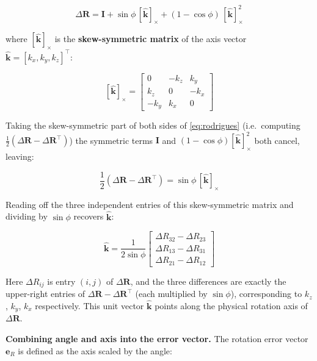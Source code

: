 \begin{equation}
\label{eq:rodrigues}
\Delta\mathbf{R}
= \mathbf{I} + \sin\phi\,[\hat{\mathbf{k}}]_\times
+ (1-\cos\phi)\,[\hat{\mathbf{k}}]_\times^2
\end{equation}

where $[\hat{\mathbf{k}}]_\times$ is the \textbf{skew-symmetric matrix}
of the axis vector $\hat{\mathbf{k}}=[k_x,k_y,k_z]^\top$:

\begin{equation}
\label{eq:skew}
[\hat{\mathbf{k}}]_\times =
\begin{bmatrix}
 0   & -k_z &  k_y \\
 k_z &  0   & -k_x \\
-k_y &  k_x &  0
\end{bmatrix}
\end{equation}

Taking the skew-symmetric part of both sides of \cref{eq:rodrigues}
(i.e.\ computing $\tfrac{1}{2}(\Delta\mathbf{R}-\Delta\mathbf{R}^\top)$)
the symmetric terms $\mathbf{I}$ and $(1-\cos\phi)[\hat{\mathbf{k}}]_\times^2$
both cancel, leaving:

\begin{equation}
\frac{1}{2}(\Delta\mathbf{R}-\Delta\mathbf{R}^\top)
= \sin\phi\,[\hat{\mathbf{k}}]_\times
\end{equation}

Reading off the three independent entries of this skew-symmetric matrix
and dividing by $\sin\phi$ recovers $\hat{\mathbf{k}}$:

\begin{equation}
\label{eq:axis}
\hat{\mathbf{k}} = \frac{1}{2\sin\phi}
\begin{bmatrix}
\Delta R_{32}-\Delta R_{23} \\
\Delta R_{13}-\Delta R_{31} \\
\Delta R_{21}-\Delta R_{12}
\end{bmatrix}
\end{equation}

Here $\Delta R_{ij}$ is entry $(i,j)$ of $\Delta\mathbf{R}$, and the
three differences are exactly the upper-right entries of
$\Delta\mathbf{R}-\Delta\mathbf{R}^\top$ (each multiplied by
$\sin\phi$), corresponding to $k_z$, $k_y$, $k_x$ respectively.
This unit vector $\hat{\mathbf{k}}$ points along the physical rotation
axis of $\Delta\mathbf{R}$.

\smallskip
\noindent\textbf{Combining angle and axis into the error vector.}
The rotation error vector $\mathbf{e}_R$ is defined as the axis scaled
by the angle:

